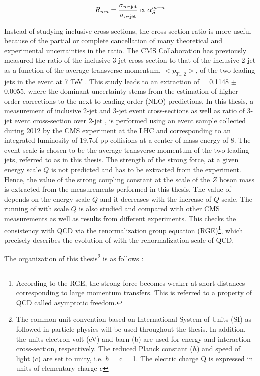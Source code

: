 \begin{equation}
R_{mn} = \frac{\sigma_{m\hy {\rm jet}}}{\sigma_{n\hy {\rm jet}}} \propto \alps^{m-n}
\label{eq:ratio_mn}
\end{equation}

Instead of studying inclusive cross-sections, the cross-section ratio is more useful because of the partial or complete cancellation of many theoretical and experimental uncertainties in the ratio. The CMS Collaboration has previously measured the ratio of the inclusive 3-jet cross-section to that of the inclusive 2-jet as a function of the average transverse momentum, $<p_{T1,2}>$, of the two leading jets in the event at 7 TeV \cite {Chatrchyan:2013txa}. This study leads to an extraction of \alpsmz = 0.1148 $\pm$ 0.0055, where the dominant uncertainty stems from the estimation of higher-order corrections to the next-to-leading order (NLO) predictions. In this thesis, a measurement of inclusive 2-jet and 3-jet event cross-sections as well as ratio of 3-jet event cross-section over 2-jet \rations, is performed using an event sample collected during 2012 by the CMS experiment at the LHC and corresponding to an integrated luminosity of 19.7\fbinv of pp collisions at a center-of-mass energy of 8\TeV. The event scale is chosen to be the average transverse momentum of the two leading jets, referred to as \httwo in this thesis. The strength of the strong force, \alps at a given energy scale $Q$ is not predicted and has to be extracted from the experiment. Hence, the value of the strong coupling constant at the scale of the $Z$ boson mass \alpsmz is extracted from the measurements performed in this thesis. The value of \alps depends on the energy scale $Q$ and it decreases with the increase of $Q$ scale. The running of \alps with scale $Q$ is also studied and compared with other CMS measurements as well as results from different experiments. This checks the consistency with QCD via the renormalization group equation (RGE)\footnote{According to the RGE, the strong force becomes weaker at short distances corresponding to large momentum transfers. This is referred to a property of QCD called asymptotic freedom.}, which precisely describes the evolution of \alps with the renormalization scale of QCD. 

The organization of this thesis\footnote{The common unit convention based on International System of Units (SI) as followed in particle physics will be used throughout the thesis. In addition, the units electron volt (eV) and barn (b) are used for energy and interaction cross-section, respectively. The reduced Planck constant ($\hbar$) and speed of light ($c$) are set to unity, i.e. $\hbar$ = c = 1. The electric charge Q is expressed in units of elementary charge $e$} is as follows :

